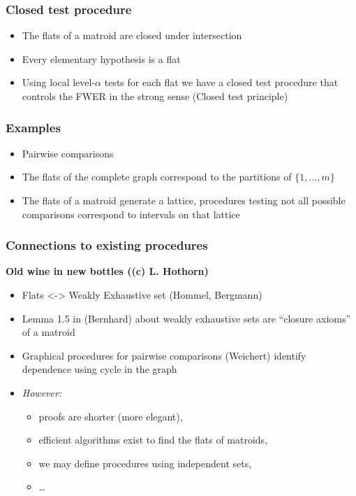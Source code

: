 \documentclass[bigger]{beamer}
\begin{document}
\begin{frame}
\frametitle{Closed test procedure}
\begin{itemize}

\item The flats of a matroid are closed under intersection

\item Every elementary hypothesis is a flat

\item Using local level-$\alpha$ tests for each flat we have a closed test procedure that controls the FWER in the strong sense (Closed test principle)

\end{itemize} %
\end{frame}



\begin{frame}
\frametitle{Examples}
\begin{itemize}

\item Pairwise comparisons

\item The flats of the complete graph correspond to the partitions of $\{1,...,m\}$

\item The flats of a matroid generate a lattice, procedures testing not all possible comparisons correspond to intervals on that lattice

\end{itemize} %
\end{frame}



\begin{frame}
\frametitle{Connections to existing procedures}

\textbf{Old wine in new bottles ((c) L. Hothorn)}
\begin{itemize}

\item Flats <-> Weakly Exhaustive set (Hommel, Bergmann)

\item Lemma 1.5 in (Bernhard) about weakly exhaustive sets are ``closure axioms'' of a matroid

\item Graphical procedures for pairwise comparisons (Weichert) identify dependence using cycle in the graph


\item \emph{However:}
\begin{itemize}
\item proofs are shorter (more elegant),
\item efficient algorithms exist to find the flats of matroids,
\item we may define procedures using independent sets,
\item \ldots{}
\end{itemize}

\end{itemize} %
\end{frame}
\end{document}
